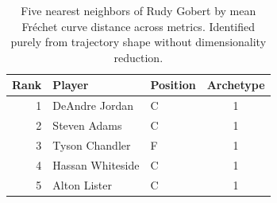 \begin{table}[htbp]
  \centering\small
  \begin{tabular}{rllc}
    \toprule
    Rank & Player & Position & Archetype \\
    \midrule
    1 & DeAndre Jordan & C & 1 \\
    2 & Steven Adams & C & 1 \\
    3 & Tyson Chandler & F & 1 \\
    4 & Hassan Whiteside & C & 1 \\
    5 & Alton Lister & C & 1 \\
    \bottomrule
  \end{tabular}
  \caption{Five nearest neighbors of Rudy Gobert by mean Fr\'{e}chet curve distance across metrics. Identified purely from trajectory shape without dimensionality reduction.}
  \label{tab:Rudy_Gobert_frechet_curve_neighbors}
\end{table}

